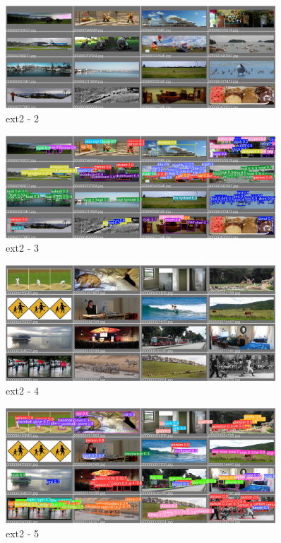 \documentclass[10pt,UTF8]{ctexart}
\begin{document}
\begin{figure}[H]
\centering 
\includegraphics[width=0.90\textwidth]{ex22.jpg} 
\caption{ext2 - 2}
\label{Test}
\end{figure}

\begin{figure}[H]
\centering 
\includegraphics[width=0.90\textwidth]{ex23.jpg} 
\caption{ext2 - 3}
\label{Test}
\end{figure}

\begin{figure}[H]
\centering 
\includegraphics[width=0.90\textwidth]{ex24.jpg} 
\caption{ext2 - 4}
\label{Test}
\end{figure}

\begin{figure}[H]
\centering 
\includegraphics[width=0.90\textwidth]{ex25.jpg} 
\caption{ext2 - 5}
\label{Test}
\end{figure}
\end{document}
